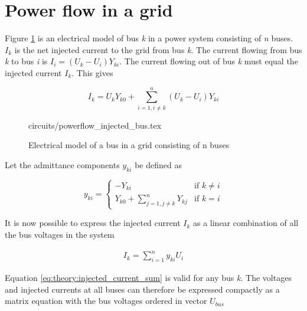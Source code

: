 \documentclass[class=book, crop=false]{standalone}
\begin{document}
\section{Power flow in a grid}
Figure \ref{fig:theory:powerflow_injected_bus} is an electrical model of bus \textit{k} in a power system consisting of \textit{n} buses. $I_{k}$ is the net injected current to the grid from bus \textit{k}\cite{opf_intro}. The current flowing from bus \textit{k} to bus \textit{i} is $I_{i} = (U_{k} - U_{i})Y_{ki}$. The current flowing out of bus \textit{k} must equal the injected current $I_{k}$. This gives

\begin{equation}\label{eq:powerflow_currentsum}
I_{k} =  U_{k}Y_{k0}
+ \sum_{i=1,i\neq k}^{n}(U_{k} - U_{i})Y_{ki}
\end{equation}



\begin{figure}[ht!]
    \center
    {circuits/powerflow_injected_bus.tex}
    \caption[size = 9]{Electrical model of a bus in a grid consisting of n buses}
    \label{fig:theory:powerflow_injected_bus}
\end{figure}

Let the admittance components $y_{ki}$ be defined as


\begin{equation}
\label{eq:theory:admittance_components}
    y_{ki} =
\left\{
	\begin{array}{ll}
		     -Y_{ki}  & 
	    \mbox{if }
	        k \neq i
	           \\
		Y_{k0} + \sum_{j=1,j\neq k}^{n} Y_{kj} & \mbox{if } k=i
	\end{array}
\right.
\end{equation}


It is now possible to  express the injected current $I_{k}$ as a linear combination of all the bus voltages in the system 

\begin{equation}
    \begin{aligned}\label{eq:theory:injected_current_sum}
    I_{k} = \sum_{i=1}^{n} y_{ki}U_{i}
    \end{aligned} 
\end{equation}

Equation \eqref{eq:theory:injected_current_sum} is valid for any bus \textit{k}. The voltages and injected currents at all buses can therefore be expressed compactly as a matrix equation with the bus voltages ordered in vector $U_{bus} $
\end{document}
